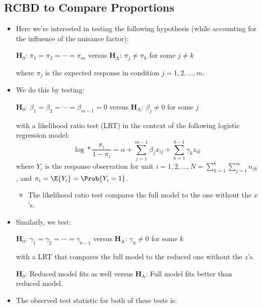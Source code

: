 \subsection{RCBD to Compare Proportions}
\begin{itemize}
      \item Here we're interested in testing the following hypothesis (while accounting for the influence of the
            nuisance factor):
            \begin{tightcenter}
                  $ \mathbf{H}_0 $: $ \pi_1=\pi_2=\cdots=\pi_m $ versus $ \mathbf{H}_\text{A} $: $ \pi_j\ne \pi_k $ for some $ j\ne k $
            \end{tightcenter}
            where $ \pi_j $ is the expected response in condition $ j=1,2,\ldots,m $.
      \item We do this by testing:
            \begin{tightcenter}
                  $ \mathbf{H}_0 $: $ \beta_1=\beta_2=\cdots=\beta_{m-1}=0 $ versus $ \mathbf{H}_\text{A} $: $ \beta_j\ne 0 $ for some $ j$
            \end{tightcenter}
            with a likelihood ratio test (LRT) in the context of the following logistic regression model:
            \[ \log*{\frac{\pi_i}{1-\pi_i}}=\alpha+\sum_{j=1}^{m-1} \beta_j x_{ij}+\sum_{k=1}^{b-1} \gamma_k z_{ik} \]
            where $ Y_i $ is the response observation for unit $ i=1,2,\ldots,N=\sum_{k=1}^{b} \sum_{j=1}^{m} n_{jk} $,
            and $ \pi_i=\E{Y_i}=\Prob{Y_i=1} $.
            \begin{itemize}
                  \item The likelihood ratio test compares the full model to the one without the $ x $'s.
            \end{itemize}
      \item Similarly, we test:
            \begin{tightcenter}
                  $ \mathbf{H}_0 $: $ \gamma_1=\gamma_2=\cdots=\gamma_{b-1} $ versus $ \mathbf{H}_\text{A} $: $ \gamma_k\ne 0 $ for some $ k $
            \end{tightcenter}
            with a LRT that compares the full model to the reduced one without the $ z $'s.
            \begin{tightcenter}
                  $ \mathbf{H}_0 $: Reduced model fits as well versus $ \mathbf{H}_\text{A} $: Full model fits better than reduced model.
            \end{tightcenter}
      \item The observed test statistic for both of these tests is:

\end{itemize}
